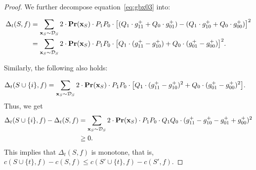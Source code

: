 \documentclass{article}
\newcommand{\z}{\textbf{z}}
\newcommand{\x}{\textbf{x}}
\newcommand{\fml}[1]{{\mathcal{#1}}}
\newcommand{\mbf}[1]{\ensuremath\mathbf{#1}}
\begin{document}
\begin{proof}
We further decompose equation~\ref{eq:gbx03} into:

\begin{equation}
\begin{aligned}
\Delta_{t}(S,f)
%
&= \sum_{\x_{S}\sim \fml{D}_{S}} 2 \cdot \mbf{Pr}(\x_{S}) \cdot 
P_{1} P_{0} \cdot \bigl[(Q_{1} \cdot g_{11}^{+} + Q_{0} \cdot g_{01}^{+}) - (Q_{1} \cdot g_{10}^{+} + Q_{0} \cdot g_{00}^{+})\bigr]^2 \\
&= \sum_{\x_{S}\sim \fml{D}_{S}} 2 \cdot \mbf{Pr}(\x_{S}) \cdot 
P_{1} P_{0} \cdot \bigl[Q_{1} \cdot (g_{11}^{+} - g_{10}^{+}) + Q_{0} \cdot (g_{01}^{+} - g_{00}^{+})\bigr]^2.
\end{aligned}
\end{equation}

Similarly, the following also holds:

\begin{equation}
\begin{aligned}
\Delta_{t}(S\cup\{i\},f)
&= \sum_{\x_{S}\sim \fml{D}_{S}}
2 \cdot \mbf{Pr}(\x_{S}) \cdot P_{1} P_{0} \cdot \bigl[Q_{1} \cdot (g_{11}^{+} - g_{10}^{+})^2 + Q_{0} \cdot (g_{01}^{+} - g_{00}^{+})^2\bigr].
\end{aligned}
\end{equation}
%
Thus, we get
\begin{equation}
\begin{aligned}
\Delta_{t}(S\cup\{i\},f) - \Delta_{t}(S,f)
&= \sum_{\x_{S}\sim \fml{D}_{S}}
2 \cdot \mbf{Pr}(\x_{S}) \cdot P_{1} P_{0} \cdot Q_{1} Q_{0} \cdot (g_{11}^{+} - g_{10}^{+} - g_{01}^{+} + g_{00}^{+})^2 \\
&\ge 0.
\end{aligned}
\end{equation}
%
This implies that $\Delta_{t}(S,f)$ is monotone, that is, $c(S\cup\{t\},f) - c(S,f) \le c(S'\cup\{t\},f) - c(S',f)$.
\end{proof}
\end{document}
